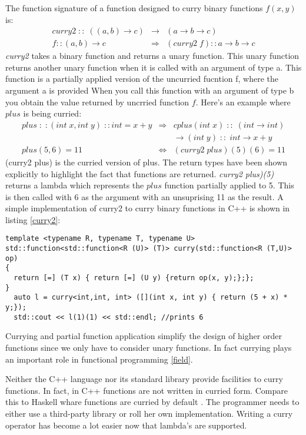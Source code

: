 \documentclass[12pt,fleqn]{article}
\begin{document}
The function signature of a function designed to curry binary functions $f(x,y)$ is:
\begin{eqnarray*}
curry2 \; :: \; ((a,b) \rightarrow c) &\rightarrow& (a \rightarrow b \rightarrow c) \\
f::(a,b) \rightarrow c &\Rightarrow&  (curry2\;f)::a \rightarrow b \rightarrow c 
\end{eqnarray*}
{\em curry2} takes a binary function and returns a unary function.
This unary function returns another unary function when it is called with an argument of type a.
This function is a partially applied version of the uncurried fucntion f, where the argument a is provided
When you call this function with an argument of type b you obtain the value returned by uncrried function $f$.
Here's an example where $plus$ is being curried:
\begin{eqnarray*}
plus\;:\;:(int \;x, int \;y) \;::int = x+y &\Rightarrow& cplus(int\; x) \;::\; (int \rightarrow int)  \\
                                                             & & \rightarrow (int \; y) \;::\; int \rightarrow x+y  \\
plus(5,6) = 11 &\Leftrightarrow&(curry2 \; plus)(5)(6) = 11
\end{eqnarray*}
(curry2 plus) is the curried version of plus.
The return types have been shown explicitly to highlight the fact that functions are returned.
{\em curry2 plus)(5)} returns a lambda which represents the $plus$ function partially applied to 5. 
This is then called with 6 as the argument with an unsuprising 11 as the result.
A simple implementation of curry2 to curry binary functions in C++ is shown in listing \ref{curry2}:
\begin{lstlisting}[caption=curry for binary operators, label=curry2]
template <typename R, typename T, typename U>
std::function<std::function<R (U)> (T)> curry(std::function<R (T,U)> op)
{
  return [=] (T x) { return [=] (U y) {return op(x, y);};};
}
  auto l = curry<int,int, int> ([](int x, int y) { return (5 + x) * y;});
  std::cout << l(1)(1) << std::endl; //prints 6
\end{lstlisting}
Currying and partial function application simplify the design of higher order functions since we only have to consider unary functions.
In fact currying plays an important role in functional programming \ref{field}. 

Neither the C++ language nor its standard library provide facilities to curry functions. 
In fact, in C++ functions are not written in curried form. 
Compare this to Haskell whare functions are curried by default \cite{lipovaca, hutton}.
The programmer needs to either use a third-party library or roll her own implementation.
Writing a curry operator has become a lot easier now that lambda's are supported.
\end{document}
